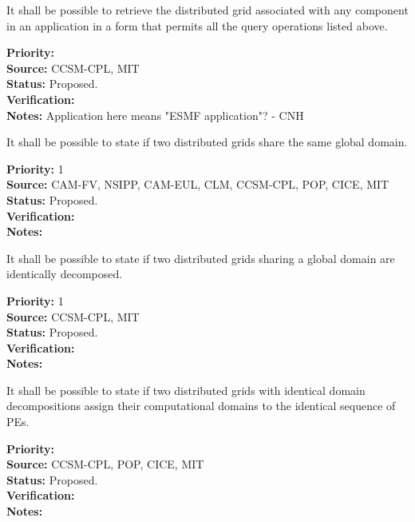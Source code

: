 
It shall be possible to retrieve the distributed grid associated with
any component in an application in a form that permits all the query
operations listed above.

\begin{reqlist}
{\bf Priority:} \\
{\bf Source:} CCSM-CPL, MIT \\
{\bf Status:} Proposed. \\
{\bf Verification:} \\
{\bf Notes:} Application here means "ESMF application"? - CNH
\end{reqlist}



It shall be possible to state if two distributed grids share the same
global domain.

\begin{reqlist}
{\bf Priority:} 1 \\ 
{\bf Source:} CAM-FV, NSIPP, CAM-EUL, CLM, CCSM-CPL, POP, CICE, MIT \\
{\bf Status:} Proposed. \\
{\bf Verification:} \\
{\bf Notes:}
\end{reqlist}



It shall be possible to state if two distributed grids sharing a
global domain are identically decomposed.

\begin{reqlist}
{\bf Priority:} 1 \\ 
{\bf Source:} CCSM-CPL, MIT \\
{\bf Status:} Proposed. \\
{\bf Verification:} \\
{\bf Notes:}
\end{reqlist}


It shall be possible to state if two distributed grids with identical
domain decompositions assign their computational domains to the
identical sequence of PEs.

\begin{reqlist}
{\bf Priority:} \\
{\bf Source:} CCSM-CPL, POP, CICE, MIT \\
{\bf Status:} Proposed. \\
{\bf Verification:} \\
{\bf Notes:}
\end{reqlist}

